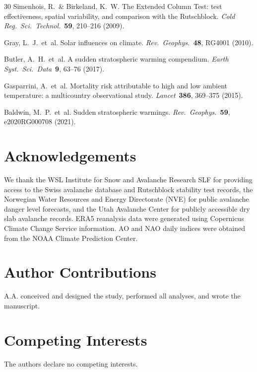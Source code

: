 \documentclass[11pt,letterpaper]{article}
\begin{document}
\begin{thebibliography}{30}
Simenhois, R.\ \& Birkeland, K.~W. The Extended Column Test: test effectiveness, spatial variability, and comparison with the Rutschblock. \textit{Cold Reg.\ Sci.\ Technol.}\ \textbf{59}, 210--216 (2009).

Gray, L.~J.\ et~al. Solar influences on climate. \textit{Rev.\ Geophys.}\ \textbf{48}, RG4001 (2010).

Butler, A.~H.\ et~al. A sudden stratospheric warming compendium. \textit{Earth Syst.\ Sci.\ Data}\ \textbf{9}, 63--76 (2017).

Gasparrini, A.\ et~al. Mortality risk attributable to high and low ambient temperature: a multicountry observational study. \textit{Lancet}\ \textbf{386}, 369--375 (2015).

Baldwin, M.~P.\ et~al. Sudden stratospheric warmings. \textit{Rev.\ Geophys.}\ \textbf{59}, e2020RG000708 (2021).

\end{thebibliography}

\section*{Acknowledgements}

We thank the WSL Institute for Snow and Avalanche Research SLF for providing access to the Swiss avalanche database and Rutschblock stability test records, the Norwegian Water Resources and Energy Directorate (NVE) for public avalanche danger level forecasts, and the Utah Avalanche Center for publicly accessible dry slab avalanche records. ERA5 reanalysis data were generated using Copernicus Climate Change Service information. AO and NAO daily indices were obtained from the NOAA Climate Prediction Center.

\section*{Author Contributions}
A.A. conceived and designed the study, performed all analyses, and wrote the manuscript.

\section*{Competing Interests}
The authors declare no competing interests.
\end{document}
